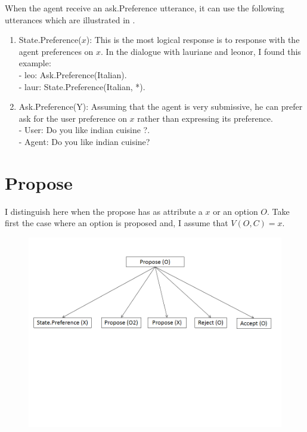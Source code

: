 \documentclass{llncs}
\begin{document}
When the agent receive an ask.Preference utterance, it can use the following utterances which are illustrated in .
 \begin{enumerate}
 \item State.Preference($x$): This is the most logical response is to response with the agent preferences on $x$. In the dialogue with lauriane and leonor, I found this example:  
 \\ - leo: Ask.Preference(Italian).
 \\ - laur: State.Preference(Italian, *). 
 
% 
 \item Ask.Preference(Y): Assuming that the agent is very submissive, he can prefer ask for the user preference on $x$ rather than expressing its preference.
 \\ - User: Do you like indian cuisine ?.
 \\ - Agent: Do you like indian cuisine? 
 \end{enumerate}

\section{Propose}
I distinguish here when the propose has as attribute a $x$ or an option $O$. 
Take first the case where an option is proposed and, I assume that $V(O,C) = x$.

\begin{figure}
\centerline{\includegraphics[width=5in]{figs/proposeO.PNG}}

\end{figure}
\end{document}
